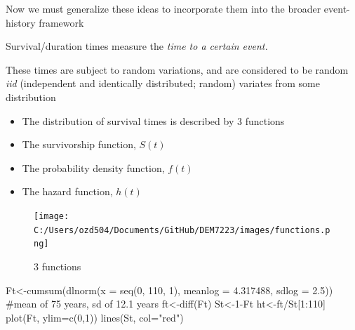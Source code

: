 \documentclass[
  letterpaper,
  DIV=11,
  numbers=noendperiod]{scrreprt}
\newenvironment{Shaded}{\begin{snugshade}}{\end{snugshade}}
\newcommand{\AttributeTok}[1]{\textcolor[rgb]{0.40,0.45,0.13}{#1}}
\newcommand{\CommentTok}[1]{\textcolor[rgb]{0.37,0.37,0.37}{#1}}
\newcommand{\DecValTok}[1]{\textcolor[rgb]{0.68,0.00,0.00}{#1}}
\newcommand{\FloatTok}[1]{\textcolor[rgb]{0.68,0.00,0.00}{#1}}
\newcommand{\FunctionTok}[1]{\textcolor[rgb]{0.28,0.35,0.67}{#1}}
\newcommand{\NormalTok}[1]{\textcolor[rgb]{0.00,0.23,0.31}{#1}}
\newcommand{\OtherTok}[1]{\textcolor[rgb]{0.00,0.23,0.31}{#1}}
\newcommand{\SpecialCharTok}[1]{\textcolor[rgb]{0.37,0.37,0.37}{#1}}
\newcommand{\StringTok}[1]{\textcolor[rgb]{0.13,0.47,0.30}{#1}}
\providecommand{\tightlist}{%
  \setlength{\itemsep}{0pt}\setlength{\parskip}{0pt}}\usepackage{longtable,booktabs,array}
\begin{document}
Now we must generalize these ideas to incorporate them into the broader
event-history framework

Survival/duration times measure the \emph{time to a certain event.}

These times are subject to random variations, and are considered to be
random \emph{iid} (independent and identically distributed; random)
variates from some distribution

\begin{itemize}
\tightlist
\item
  The distribution of survival times is described by 3 functions
\item
  The survivorship function, \(S(t)\)
\item
  The probability density function, \(f(t)\)
\item
  The hazard function, \(h(t)\)
\end{itemize}

\begin{figure}

{\centering \texttt{[image: C:/Users/ozd504/Documents/GitHub/DEM7223/images/functions.png]}

}

\caption{3 functions}

\end{figure}

\begin{Shaded}
\begin{Highlighting}[]
\NormalTok{Ft}\OtherTok{\textless{}{-}}\FunctionTok{cumsum}\NormalTok{(}\FunctionTok{dlnorm}\NormalTok{(}\AttributeTok{x =} \FunctionTok{seq}\NormalTok{(}\DecValTok{0}\NormalTok{, }\DecValTok{110}\NormalTok{, }\DecValTok{1}\NormalTok{), }\AttributeTok{meanlog =} \FloatTok{4.317488}\NormalTok{, }\AttributeTok{sdlog =} \FloatTok{2.5}\NormalTok{)) }\CommentTok{\#mean of 75 years, sd of 12.1 years}
\NormalTok{ft}\OtherTok{\textless{}{-}}\FunctionTok{diff}\NormalTok{(Ft)}
\NormalTok{St}\OtherTok{\textless{}{-}}\DecValTok{1}\SpecialCharTok{{-}}\NormalTok{Ft}
\NormalTok{ht}\OtherTok{\textless{}{-}}\NormalTok{ft}\SpecialCharTok{/}\NormalTok{St[}\DecValTok{1}\SpecialCharTok{:}\DecValTok{110}\NormalTok{]}
\FunctionTok{plot}\NormalTok{(Ft, }\AttributeTok{ylim=}\FunctionTok{c}\NormalTok{(}\DecValTok{0}\NormalTok{,}\DecValTok{1}\NormalTok{))}
\FunctionTok{lines}\NormalTok{(St, }\AttributeTok{col=}\StringTok{"red"}\NormalTok{)}
\end{Highlighting}
\end{Shaded}
\end{document}
